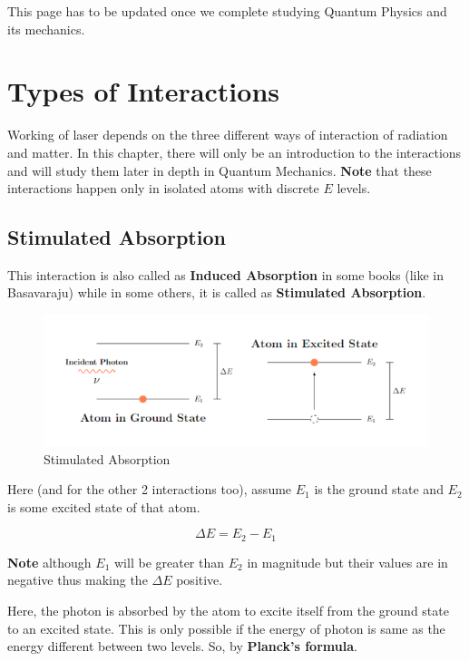 \documentclass[12pt]{article}
\begin{document}
This page has to be updated once we complete studying Quantum Physics and its mechanics.

\section{Types of Interactions}

Working of laser depends on the three different ways of interaction of radiation and matter. In this chapter, there will only be an introduction to the interactions and will study them later in depth in Quantum Mechanics. \textbf{Note} that these interactions happen only in isolated atoms with discrete $E$ levels.

\subsection{Stimulated Absorption}

This interaction is also called as \textbf{Induced Absorption} in some books (like in Basavaraju) while in some others, it is called as \textbf{Stimulated Absorption}.

\begin{figure}[H]
    \centering
    \includegraphics[scale=0.5]{./img/03_induced_absorption.png}
    \caption{Stimulated Absorption}
\end{figure}

Here (and for the other 2 interactions too), assume $E_{1}$ is the ground state and $E_{2}$ is some excited state of that atom.

\begin{equation}
    \Delta E = E_{2} - E_{1}
\end{equation}

\textbf{Note} although $E_{1}$ will be greater than $E_{2}$ in magnitude but their values are in negative thus making the $\Delta E$ positive.

Here, the photon is absorbed by the atom to excite itself from the ground state to an excited state. This is only possible if the energy of photon is same as the energy different between two levels. So, by \textbf{Planck's formula}.
\end{document}
